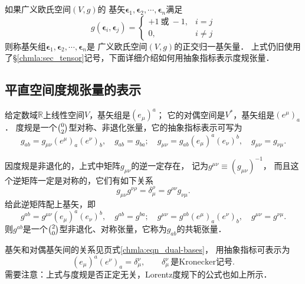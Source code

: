      
     



如果广义欧氏空间$(V,g)$的
基矢$\boldsymbol{\epsilon}_1,\boldsymbol{\epsilon}_2,\cdots,\boldsymbol{\epsilon}_n$满足
\begin{equation}\label{chdm:eqn_unitary-bases}
    g(\boldsymbol{\epsilon}_i,\boldsymbol{\epsilon}_j) = 
    \begin{cases}
        +1 \ \text{或} \ -1, & i=j \\
        0, & i \neq j
    \end{cases}
\end{equation}
则称基矢组$\boldsymbol{\epsilon}_1,\boldsymbol{\epsilon}_2,\cdots,\boldsymbol{\epsilon}_n$是
广义欧氏空间$(V,g)$的{\heiti 正交归一}基矢量．
上式仍旧使用了\S\ref{chmla:sec_tensor}记号，下面详细介绍如何用抽象指标表示度规张量．


\subsection{平直空间度规张量的表示}\label{chdm:sec_metric-abi}
给定数域$\mathbb{R}$上线性空间$V$，基矢组是$(e_\mu)^a$；
它的对偶空间是$V^*$，基矢组是$(e^\mu)_a$．
度规是一个$\binom{0}{2}$型对称、非退化张量，它的抽象指标表示可写为
\begin{equation}\label{chdm:eqn_Euclid-gab}
    g_{ab} = g_{\mu\nu} (e^\mu)_a (e^\nu)_b, \quad g_{ab} = g_{ba}; \quad
    g_{\mu\nu} = g_{ab} (e_\mu)^a (e_\nu)^b, \quad g_{\mu\nu} = g_{\nu\mu}.
\end{equation}

因度规是非退化的，上式中矩阵$g_{\mu\nu}$的逆一定存在，
记为$g^{\mu\nu}\equiv (g_{\mu\nu})^{-1}$，
而且这个逆矩阵一定是对称的，它们有如下关系
\begin{equation}
    g_{\mu\nu} g^{\nu\rho}= \delta_\mu ^\rho = g^{\rho\nu}g_{\nu\mu} . 
\end{equation}
给此逆矩阵配上基矢，即
\begin{equation}
     g^{ab} = g^{\mu\nu} (e_\mu)^a (e_\nu)^b, \quad g^{ab} = g^{ba}; \quad
     g^{\mu\nu} = g^{ab} (e^\mu)_a (e^\nu)_b, \quad g^{\mu\nu} = g^{\nu\mu}.
\end{equation}
则$g^{ab}$是一个$\binom{2}{0}$型非退化、对称张量，它称为$g_{ab}$的{\heiti 共轭张量}．


基矢和对偶基矢间的关系见\pageref{chmla:eqn_dual-bases}页式\eqref{chmla:eqn_dual-bases}，
用抽象指标可表示为
\begin{equation}
    (e_\mu )^a (e^\nu)_a =\delta_\mu ^\nu, \qquad 
    \delta_\mu ^\nu \, \text{是Kronecker记号} .
\end{equation}
需要注意：上式与度规是否正定无关，Lorentz度规下的公式也如上所示．

